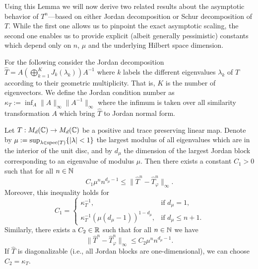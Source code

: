 \documentclass[11pt,a4paper]{article}
\theoremstyle{plain}
\theoremstyle{definition}
\theoremstyle{remark}
\begin{document}
Using this Lemma we will now derive two related results about the asymptotic behavior of $T^n$---based on either Jordan decomposition or Schur decomposition of $T$.
While the first one allows us to pinpoint the exact asymptotic scaling, the second one enables us to provide explicit (albeit generally pessimistic) constants
which depend only on $n$, $\mu$ and the underlying Hilbert space dimension.

For the following consider the Jordan decomposition $\hat{T}=A(\bigoplus_{k=1}^K J_k(\lambda_k))A^{-1}$ where $k$ labels the different eigenvalues $\lambda_k$ of $T$
according to their geometric multiplicity. That is, $K$ is the number of eigenvectors. We define the Jordan condition number as
$\kappa_T := \inf_A \|A\|_\infty\|A^{-1}\|_\infty$ where the infimum is taken over all similarity transformation $A$ which bring $\hat{T}$ to Jordan normal form.

\begin{theorem}
    Let $T:M_d(\mathbb{C})\to M_d(\mathbb{C})$ be a positive and trace preserving linear map. Denote by
    $\mu:=\sup_{\lambda\in\operatorname{spec}(T)}\{|\lambda|<1\}$ the largest modulus of all eigenvalues which are in the interior of the unit disc, and by $d_\mu$
    the dimension of the largest Jordan block corresponding to an eigenvalue of modulus $\mu$. Then there exists a constant $C_1>0$ such that for all $n\in\mathbb{N}$
    \begin{equation}\tag{8.106}
        C_1\mu^n n^{d_\mu-1} \le \|\hat{T}^n-\hat{T}_\varphi^n\|_\infty.
    \end{equation}
    Moreover, this inequality holds for
    \[
        C_1=
        \begin{cases}
            \kappa_T^{-1},                         & \text{if } d_\mu=1,      \\
            \kappa_T^{-1}(\mu(d_\mu-1))^{1-d_\mu}, & \text{if } d_\mu\le n+1.
        \end{cases}
    \]
    Similarly, there exists a $C_2\in\mathbb{R}$ such that for all $n\in\mathbb{N}$ we have
    \begin{equation}\tag{8.107}
        \|\hat{T}^n-\hat{T}_\varphi^n\|_\infty \le C_2\mu^n n^{d_\mu-1}.
    \end{equation}
    If $\hat{T}$ is diagonalizable (i.e., all Jordan blocks are one-dimensional), we can choose $C_2=\kappa_T$.
\end{theorem}
\end{document}
